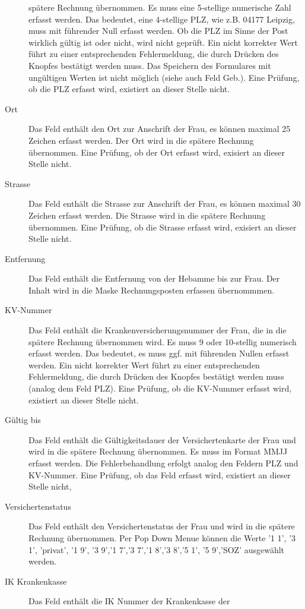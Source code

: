 \begin{description}
spätere Rechnung übernommen. Es muss eine 5-stellige numerische Zahl
 erfasst werden. Das
bedeutet, eine 4-stellige PLZ, wie z.B. 04177 Leipzig,
muss mit führender Null erfasst werden. Ob
die PLZ im Sinne der Post wirklich gültig ist oder nicht, wird nicht
geprüft. Ein nicht korrekter Wert führt zu einer entsprechenden Fehlermeldung,
die durch Drücken des Knopfes  bestätigt werden muss.
Das Speichern des Formulares mit ungültigen Werten ist nicht möglich (siehe auch Feld Geb.).
Eine Prüfung, ob die PLZ erfasst wird, existiert an dieser Stelle nicht.
\item[Ort] Das Feld enthält den Ort zur Anschrift der Frau, es können
maximal 25 Zeichen erfasst werden. Der Ort wird in die 
spätere Rechnung übernommen. Eine Prüfung, ob der Ort erfasst wird, exisiert
an dieser Stelle nicht.
\item[Strasse] Das Feld enthält die Strasse zur Anschrift der Frau, es können
maximal 30 Zeichen erfasst werden. Die Strasse wird in die 
spätere Rechnung übernommen. Eine Prüfung, ob die Strasse erfasst wird, 
exisiert an dieser Stelle nicht.
\item[Entfernung] Das Feld enthält die Entfernung von der Hebamme bis zur Frau.
Der Inhalt wird in die Maske Rechnungsposten erfassen übernommmen.
\item[KV-Nummer] Das Feld enthält die Krankenversicherungsnummer der Frau, die
in die spätere Rechnung übernommen wird.
Es muss 9 oder 10-stellig numerisch erfasst werden. 
Das bedeutet, es muss ggf. mit
führenden Nullen erfasst werden. Ein nicht korrekter Wert führt zu einer
entsprechenden Fehlermeldung, die durch Drücken des Knopfes 
bestätigt werden muss (analog dem Feld PLZ). Eine Prüfung, ob die KV-Nummer
erfasst wird, existiert an dieser Stelle nicht.
\item[Gültig bis] Das Feld enthält die Gültigkeitsdauer der Versichertenkarte
der Frau und wird in die spätere Rechnung übernommen. Es muss im Format
MMJJ erfasst werden. Die Fehlerbehandlung erfolgt analog den Feldern
PLZ und KV-Nummer. Eine Prüfung, ob das Feld erfasst wird, existiert an
dieser Stelle nicht,
\item[Versichertenstatus] 
Das Feld enthält den Versichertenstatus der Frau
und wird in die spätere Rechnung übernommen. Per Pop Down Menue können
die Werte '1 1', '3 1', 'privat', '1 9', '3 9','1 7','3 7','1 8','3 8','5 1',
'5 9','SOZ' ausgewählt werden.
\item[IK Krankenkasse] Das Feld enthält die IK Nummer der Krankenkasse der

\end{description}

